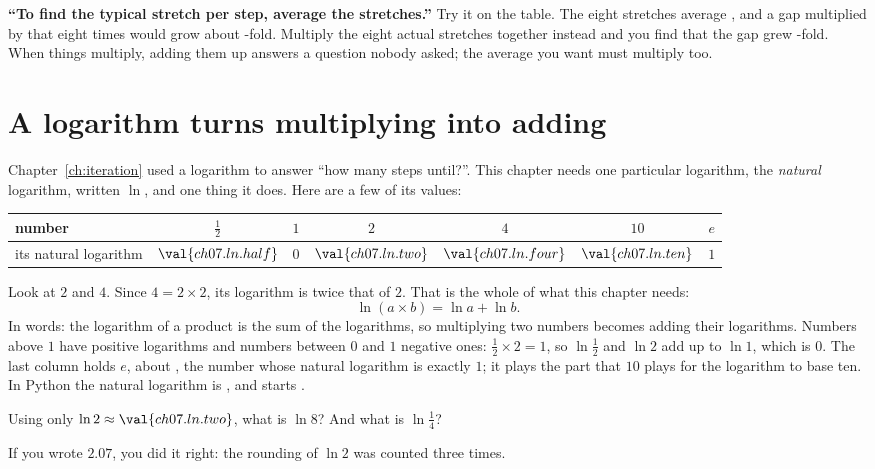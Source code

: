 \begin{trapbox}
\textbf{\enquote{To find the typical stretch per step, average the
stretches.}} Try it on the table. The eight stretches average
, and a gap multiplied by that eight times would grow
about -fold. Multiply the eight actual stretches
together instead and you find that the gap grew -fold.
When things multiply, adding them up answers a question nobody asked; the
average you want must multiply too.
\end{trapbox}

\section{A logarithm turns multiplying into adding}
\label{sec:ch07-log}

\noindent
Chapter~\ref{ch:iteration} used a logarithm to answer \enquote{how many steps
until?}. This chapter needs one particular logarithm, the \emph{natural}
logarithm, written $\ln$, and one thing it does. Here are a few of its values:

\begin{center}
\begin{tabular}{lcccccc}
\toprule
number & $\tfrac12$ & $1$ & $2$ & $4$ & $10$ & $e$ \\
\midrule
its natural logarithm & $\val{ch07.ln.half}$ & $0$ & $\val{ch07.ln.two}$ &
  $\val{ch07.ln.four}$ & $\val{ch07.ln.ten}$ & $1$ \\
\bottomrule
\end{tabular}
\end{center}

\noindent
Look at $2$ and $4$. Since $4 = 2 \times 2$, its logarithm is twice that
of $2$. That is the whole of what this chapter needs:
\[ \ln(a \times b) = \ln a + \ln b. \]
In words: the logarithm of a product is the sum of the logarithms, so
multiplying two numbers becomes adding their logarithms. Numbers above $1$
have positive logarithms and numbers between $0$ and $1$ negative ones:
$\tfrac12 \times 2 = 1$, so $\ln\tfrac12$ and $\ln 2$ add up to $\ln 1$,
which is $0$. The last column holds $e$, about , the number whose
natural logarithm is exactly $1$; it plays the part that $10$ plays for the
logarithm to base ten. In Python the natural logarithm is ,
and  starts .

\begin{think}
Using only $\ln 2 \approx \val{ch07.ln.two}$, what is $\ln 8$? And what is
$\ln\tfrac14$?
\end{think}
If you wrote $\num{2.07}$, you did it right: the rounding of $\ln 2$ was
counted three times.


